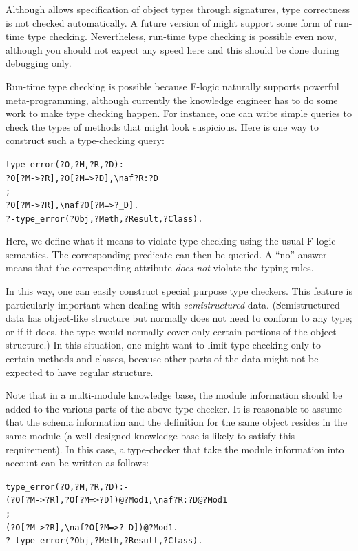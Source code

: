 \documentclass[11pt]{article}
\newcommand{\ERGO}{\mbox{\smaller{\ensuremath{\cal{E}}\smaller{{\sc{RGO}}}}}\xspace}
\newcommand{\FLSYSTEM}{\ERGO}
\newcommand{\bs}{\textbackslash}
\newcommand{\fl}{\mbox{F-logic}\xspace}
\newcommand{\RULELOGNAF}{{\texttt{{\bs}naf}}\xspace}
\begin{document}
Although \FLSYSTEM allows specification of object types through signatures,
type correctness is not checked automatically.
A future version of \FLSYSTEM might support some form of run-time type
checking. Nevertheless, run-time type checking is possible even now,
although you should not expect any speed here and this should be done
during debugging only.

Run-time type checking is possible because \fl naturally supports powerful
meta-programming, although currently the knowledge engineer
has to do some work to
make type checking happen.  For instance, one can write simple
queries to check the types of methods that might look suspicious.  Here is
one way to construct such a type-checking query:
\begin{alltt}
type_error(?O,?M,?R,?D) :-
       ?O[?M->?R], ?O[?M=>?D], \RULELOGNAF ?R:?D
       ;
       ?O[?M->?R], \RULELOGNAF ?O[?M=>?_D].
?- type_error(?Obj,?Meth,?Result,?Class).
\end{alltt}
Here, we define what it means to violate type checking using the usual
\fl semantics. The corresponding predicate can then be queried. A
``no'' answer means that the corresponding attribute \emph{does not}
violate the typing rules.

In this way, one can easily construct special purpose type checkers.  This
feature is particularly important when dealing with \emph{semistructured}
data. (Semistructured data has object-like structure but normally does not
need to conform to any type; or if it does, the type would normally cover
only certain portions of the object structure.) In this situation, one
might want to limit type checking only to certain methods and classes,
because other parts of the data might not be expected to have regular
structure.

Note that in a multi-module knowledge base, the module information should be added
to the various parts of the above type-checker. It is reasonable to assume
that the schema information and the definition for the same object
resides in the same module (a well-designed knowledge base is likely to satisfy
this requirement). In this case, a type-checker that take the module
information into account can be written as follows:
\begin{alltt}
type_error(?O,?M,?R,?D) :-
       (?O[?M->?R], ?O[?M=>?D])@?Mod1, \RULELOGNAF ?R:?D@?Mod1
       ;
       (?O[?M->?R], \RULELOGNAF ?O[?M=>?_D])@?Mod1.
?- type_error(?Obj,?Meth,?Result,?Class).
\end{alltt}
\end{document}

